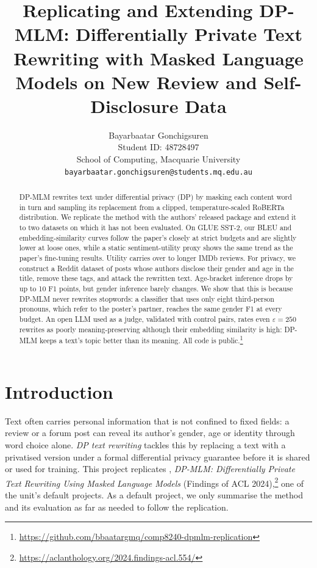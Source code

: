 \documentclass[11pt]{article}
\title{Replicating and Extending DP-MLM: Differentially Private Text Rewriting with Masked Language Models on New Review and Self-Disclosure Data}
\author{
  Bayarbaatar Gonchigsuren \\
  Student ID: 48728497 \\
  School of Computing, Macquarie University \\
  \texttt{bayarbaatar.gonchigsuren@students.mq.edu.au}
}
\newcommand{\repourl}{\url{https://github.com/bbaatargmq/comp8240-dpmlm-replication}}
\begin{document}
\maketitle

\begin{abstract}
DP-MLM \citep{meisenbacher-etal-2024-dp-mlm} rewrites text under differential privacy (DP) by masking each content word in turn and sampling its replacement from a clipped, temperature-scaled RoBERTa distribution. We replicate the method with the authors' released package and extend it to two datasets on which it has not been evaluated. On GLUE SST-2, our BLEU and embedding-similarity curves follow the paper's closely at strict budgets and are slightly lower at loose ones, while a static sentiment-utility proxy shows the same trend as the paper's fine-tuning results. Utility carries over to longer IMDb reviews. For privacy, we construct a Reddit dataset of \FunTag{} posts whose authors disclose their gender and age in the title, remove these tags, and attack the rewritten text. Age-bracket inference drops by up to 10 F1 points, but gender inference barely changes. We show that this is because DP-MLM never rewrites stopwords: a classifier that uses only eight third-person pronouns, which refer to the poster's partner, reaches the same gender F1 at every budget. An open LLM used as a judge, validated with control pairs, rates even $\varepsilon=250$ rewrites as poorly meaning-preserving although their embedding similarity is high: DP-MLM keeps a text's topic better than its meaning. All code is public.\footnote{\repourl}
\end{abstract}

\section{Introduction}
Text often carries personal information that is not confined to fixed fields: a review or a forum post can reveal its author's gender, age or identity through word choice alone. \emph{DP text rewriting} tackles this by replacing a text with a privatised version under a formal differential privacy guarantee \citep{dwork2006differential} before it is shared or used for training. This project replicates \citet{meisenbacher-etal-2024-dp-mlm}, \emph{DP-MLM: Differentially Private Text Rewriting Using Masked Language Models} (Findings of ACL 2024),\footnote{\url{https://aclanthology.org/2024.findings-acl.554/}} one of the unit's default projects. As a default project, we only summarise the method and its evaluation as far as needed to follow the replication.
\end{document}
